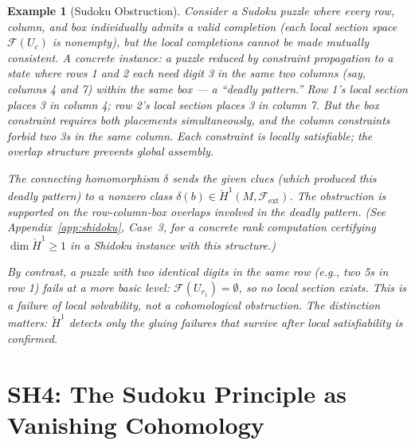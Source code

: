 \documentclass[11pt,letterpaper]{article}
\newtheorem{example}[conjecture]{Example}
\newcommand{\Hcech}{\check{H}}
\newcommand{\sheaf}{\mathcal{F}}
\begin{document}
\begin{example}[Sudoku Obstruction]
Consider a Sudoku puzzle where every row, column, and box individually 
admits a valid completion (each local section space $\sheaf(U_c)$ is 
nonempty), but the local completions cannot be made mutually consistent. 
A concrete instance: a puzzle reduced by constraint propagation to a 
state where rows 1 and 2 each need digit 3 in the same two columns 
(say, columns 4 and 7) within the same box --- a ``deadly pattern.'' 
Row 1's local section places 3 in column 4; row 2's local section 
places 3 in column 7. But the box constraint requires both placements 
simultaneously, and the column constraints forbid two 3s in the same 
column. Each constraint is locally satisfiable; the \emph{overlap 
structure} prevents global assembly.

The connecting homomorphism $\delta$ sends the given clues (which 
produced this deadly pattern) to a nonzero class 
$\delta(b) \in \Hcech^1(M, \sheaf_{\mathrm{ext}})$. The obstruction 
is supported on the row-column-box overlaps involved in the deadly 
pattern. (See Appendix~\ref{app:shidoku}, Case~3, for a concrete 
rank computation certifying $\dim \Hcech^1 \geq 1$ in a Shidoku 
instance with this structure.)

By contrast, a puzzle with two identical digits in the same row (e.g., 
two 5s in row 1) fails at a more basic level: $\sheaf(U_{r_1}) = 
\emptyset$, so no local section exists. This is a failure of local 
solvability, not a cohomological obstruction. The distinction matters: 
$\Hcech^1$ detects only the gluing failures that survive after local 
satisfiability is confirmed.
\end{example}

\section{SH4: The Sudoku Principle as Vanishing Cohomology}
\end{document}
